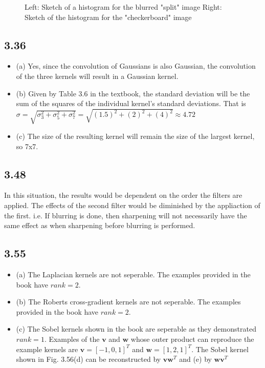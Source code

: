 \documentclass{article}[12 pt]
\begin{document}
\begin{figure}[h!]
\captionsetup[subfloat]{labelformat=empty}
\centering
{}
\caption{Left: Sketch of a histogram for the blurred "split" image Right: Sketch of the histogram for the "checkerboard" image}
\end{figure}

\subsection*{3.36}
\begin{itemize}
\item (a) Yes, since the convolution of Gaussians is also Gaussian, the convolution of the three kernels will result in a Gaussian kernel. 

\item (b)  Given by Table 3.6 in the textbook, the standard deviation will be the sum of the squares of the individual kernel's standard deviations.  That is $\sigma = \sqrt{\sigma_{3}^{2}+\sigma_{5}^{2} + \sigma_{7}^{2}} = \sqrt{(1.5)^{2}+(2)^{2} + (4)^{2}} \approx 4.72 $

\item (c) The size of the resulting kernel will remain the size of the largest kernel, so 7x7.
\end{itemize}


\subsection*{3.48}
In this situation, the results would be dependent on the order the filters are applied. The effects of the second filter would be diminished by the appliaction of the first.  i.e. If blurring is done, then sharpening will not necessarily have the same effect as when sharpening before blurring is performed.


\subsection*{3.55}
\begin{itemize}
\item (a) The Laplacian kernels are not seperable.  The examples provided in the book have $rank=2$.

\item (b)  The Roberts cross-gradient kernels are not seperable.  The examples provided in the book have $rank=2$.

\item (c) The Sobel kernels shown in the book are seperable as they demonstrated $rank=1$.  Examples of the $\bm{v}$ and $\bm{w}$ whose outer product can reproduce the example kernels are $\bm{v} = [-1, 0, 1]^T$ and $\bm{w} = [1, 2, 1]^T$.  The Sobel kernel shown in Fig. 3.56(d) can be reconstructed by $\bm{v}\bm{w}^T$ and (e) by $\bm{w}\bm{v}^T$
\end{itemize}
\end{document}
